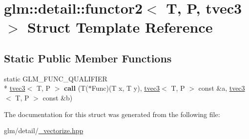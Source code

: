 \hypertarget{structglm_1_1detail_1_1functor2_3_01T_00_01P_00_01tvec3_01_4}{\section{glm\-:\-:detail\-:\-:functor2$<$ T, P, tvec3 $>$ Struct Template Reference}
\label{structglm_1_1detail_1_1functor2_3_01T_00_01P_00_01tvec3_01_4}
}
\subsection*{Static Public Member Functions}
\begin{DoxyCompactItemize}
\item 
\hypertarget{structglm_1_1detail_1_1functor2_3_01T_00_01P_00_01tvec3_01_4_a2dc546f8027af1bbceab38b5a2b5a146}{static G\-L\-M\-\_\-\-F\-U\-N\-C\-\_\-\-Q\-U\-A\-L\-I\-F\-I\-E\-R \\*
\hyperlink{structglm_1_1tvec3}{tvec3}$<$ T, P $>$ {\bfseries call} (T($\ast$Func)(T x, T y), \hyperlink{structglm_1_1tvec3}{tvec3}$<$ T, P $>$ const \&a, \hyperlink{structglm_1_1tvec3}{tvec3}$<$ T, P $>$ const \&b)}\label{structglm_1_1detail_1_1functor2_3_01T_00_01P_00_01tvec3_01_4_a2dc546f8027af1bbceab38b5a2b5a146}

\end{DoxyCompactItemize}


The documentation for this struct was generated from the following file\-:\begin{DoxyCompactItemize}
\item 
glm/detail/\hyperlink{__vectorize_8hpp}{\-\_\-vectorize.\-hpp}\end{DoxyCompactItemize}
